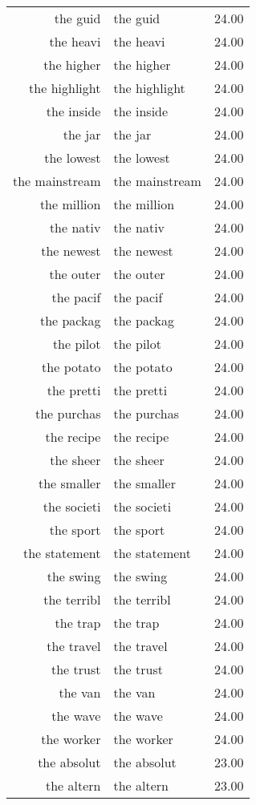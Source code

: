 \begin{table}[ht]
\begin{tabular}{rlr}
  the guid & the guid & 24.00 \\ 
  the heavi & the heavi & 24.00 \\ 
  the higher & the higher & 24.00 \\ 
  the highlight & the highlight & 24.00 \\ 
  the inside & the inside & 24.00 \\ 
  the jar & the jar & 24.00 \\ 
  the lowest & the lowest & 24.00 \\ 
  the mainstream & the mainstream & 24.00 \\ 
  the million & the million & 24.00 \\ 
  the nativ & the nativ & 24.00 \\ 
  the newest & the newest & 24.00 \\ 
  the outer & the outer & 24.00 \\ 
  the pacif & the pacif & 24.00 \\ 
  the packag & the packag & 24.00 \\ 
  the pilot & the pilot & 24.00 \\ 
  the potato & the potato & 24.00 \\ 
  the pretti & the pretti & 24.00 \\ 
  the purchas & the purchas & 24.00 \\ 
  the recipe & the recipe & 24.00 \\ 
  the sheer & the sheer & 24.00 \\ 
  the smaller & the smaller & 24.00 \\ 
  the societi & the societi & 24.00 \\ 
  the sport & the sport & 24.00 \\ 
  the statement & the statement & 24.00 \\ 
  the swing & the swing & 24.00 \\ 
  the terribl & the terribl & 24.00 \\ 
  the trap & the trap & 24.00 \\ 
  the travel & the travel & 24.00 \\ 
  the trust & the trust & 24.00 \\ 
  the van & the van & 24.00 \\ 
  the wave & the wave & 24.00 \\ 
  the worker & the worker & 24.00 \\ 
  the absolut & the absolut & 23.00 \\ 
  the altern & the altern & 23.00 \\ 

\end{tabular}
\end{table}
